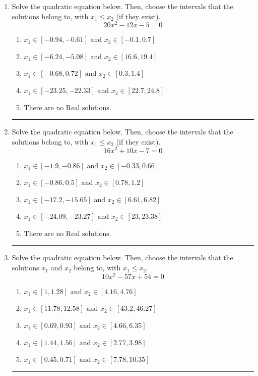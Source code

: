 \documentclass[14pt]{extbook}
\newcommand{\litem}[1]{\item#1\hspace*{-1cm}\rule{\textwidth}{0.4pt}}
\begin{document}
\begin{enumerate}
{\begin{enumerate}[label=\Alph*.]
\end{enumerate} }
\litem{
Solve the quadratic equation below. Then, choose the intervals that the solutions belong to, with $x_1 \leq x_2$ (if they exist).\[ 20x^{2} -12 x -5 = 0 \]\begin{enumerate}[label=\Alph*.]
\item \( x_1 \in [-0.94, -0.61] \text{ and } x_2 \in [-0.1, 0.7] \)
\item \( x_1 \in [-6.24, -5.08] \text{ and } x_2 \in [16.6, 19.4] \)
\item \( x_1 \in [-0.68, 0.72] \text{ and } x_2 \in [0.3, 1.4] \)
\item \( x_1 \in [-23.25, -22.33] \text{ and } x_2 \in [22.7, 24.8] \)
\item \( \text{There are no Real solutions.} \)

\end{enumerate} }
\litem{
Solve the quadratic equation below. Then, choose the intervals that the solutions belong to, with $x_1 \leq x_2$ (if they exist).\[ 16x^{2} +10 x -7 = 0 \]\begin{enumerate}[label=\Alph*.]
\item \( x_1 \in [-1.9, -0.86] \text{ and } x_2 \in [-0.33, 0.66] \)
\item \( x_1 \in [-0.86, 0.5] \text{ and } x_2 \in [0.78, 1.2] \)
\item \( x_1 \in [-17.2, -15.65] \text{ and } x_2 \in [6.61, 6.82] \)
\item \( x_1 \in [-24.09, -23.27] \text{ and } x_2 \in [23, 23.38] \)
\item \( \text{There are no Real solutions.} \)

\end{enumerate} }
\litem{
Solve the quadratic equation below. Then, choose the intervals that the solutions $x_1$ and $x_2$ belong to, with $x_1 \leq x_2$.\[ 10x^{2} -57 x + 54 = 0 \]\begin{enumerate}[label=\Alph*.]
\item \( x_1 \in [1, 1.28] \text{ and } x_2 \in [4.16, 4.76] \)
\item \( x_1 \in [11.78, 12.58] \text{ and } x_2 \in [43.2, 46.27] \)
\item \( x_1 \in [0.69, 0.93] \text{ and } x_2 \in [4.66, 6.35] \)
\item \( x_1 \in [1.44, 1.56] \text{ and } x_2 \in [2.77, 3.98] \)
\item \( x_1 \in [0.45, 0.71] \text{ and } x_2 \in [7.78, 10.35] \)


\end{enumerate}}
\end{enumerate}
\end{document}
